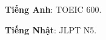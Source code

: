 \begin{cvempty} %
  \begin{cvitems} %
    \item {\textbf{Tiếng Anh}: TOEIC 600.}
    \item {\textbf{Tiếng Nhật}: JLPT N5.}
  \end{cvitems}
\end{cvempty}
